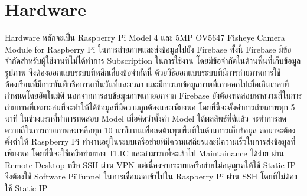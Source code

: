 \section{Hardware}
Hardware หลักจะเป็น Raspberry Pi Model 4 และ 5MP OV5647 Fisheye Camera Module for Raspberry Pi ในการถ่ายภาพและส่งข้อมูลไปยัง Firebase
\enskip ทั้งนี้ Firebase มีข้อจำกัดสำหรับผู้ใช้งานที่ไม่ได้ทำการ Subscription ในการใช้งาน โดยมีข้อจำกัดในด้านพื้นที่เก็บข้อมูลรูปภาพ จึงต้องออกแบบระบบที่หลีกเลี่ยงข้อจำกัดนี้
\enskip ด้วยวิธีออกแบบระบบที่มีการถ่ายภาพการใช้ห้องเรียนที่มีการบันทึกชื่อภาพเป็นวันที่และเวลา และมีการลบข้อมูลภาพที่เก่าออกไปเมื่อเกินเวลาที่กำหนดโดยอัตโนมัติ
\enskip นอกจากการลบข้อมูลภาพเก่าออกจาก Firebase ยังต้องทดสอบหาความถี่ในการถ่ายภาพที่เหมาะสมที่จะทำให้ได้ข้อมูลที่มีความถูกต้องและเพียงพอ โดยที่นี้จะตั้งค่าการถ่ายภาพทุก 5 นาที
\enskip ในช่วงแรกที่ทำการทดสอบ Model เมื่อคิดว่าตั้งค่า Model ได้ผลลัพธ์ที่ดีแล้ว จะทำการลดความถี่ในการถ่ายภาพลงเหลือทุก 10 นาทีแทนเพื่อลดต้นทุนพื้นที่ในด้านการเก็บข้อมูล
\enskip ต่อมาจะต้องตั้งต่าให้ Raspberry Pi ทำงานอยู่ในระบบเครือข่ายที่มีความเสถียรและมีความเร็วในการส่งข้อมูลที่เพียงพอ โดยที่นี้จะใช้เครือข่ายของ TLIC และสามารถที่จะเข้าไป Maintainance ได้ง่าย
\enskip ผ่าน Remote Desktop หรือ SSH ผ่าน VPN แต่เนื่องจากระบบเครือข่ายไม่อนุญาตให้ใช้ Static IP จึงต้องใช้ Software PiTunnel ในการเชื่อมต่อเข้าไปใน Raspberry Pi ผ่าน SSH โดยที่ไม่ต้องใช้ Static IP





